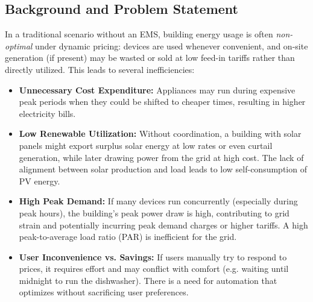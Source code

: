 \documentclass[12pt,a4paper]{article}
\begin{document}
\subsection*{Background and Problem Statement}
In a traditional scenario without an EMS, building energy usage is often \textit{non-optimal} under dynamic pricing: devices are used whenever convenient, and on-site generation (if present) may be wasted or sold at low feed-in tariffs rather than directly utilized. This leads to several inefficiencies:
\begin{itemize}
    \item \textbf{Unnecessary Cost Expenditure:} Appliances may run during expensive peak periods when they could be shifted to cheaper times, resulting in higher electricity bills.
    \item \textbf{Low Renewable Utilization:} Without coordination, a building with solar panels might export surplus solar energy at low rates or even curtail generation, while later drawing power from the grid at high cost. The lack of alignment between solar production and load leads to low self-consumption of PV energy.
    \item \textbf{High Peak Demand:} If many devices run concurrently (especially during peak hours), the building’s peak power draw is high, contributing to grid strain and potentially incurring peak demand charges or higher tariffs. A high peak-to-average load ratio (PAR) is inefficient for the grid.
    \item \textbf{User Inconvenience vs. Savings:} If users manually try to respond to prices, it requires effort and may conflict with comfort (e.g. waiting until midnight to run the dishwasher). There is a need for automation that optimizes without sacrificing user preferences.
\end{itemize}
\end{document}
